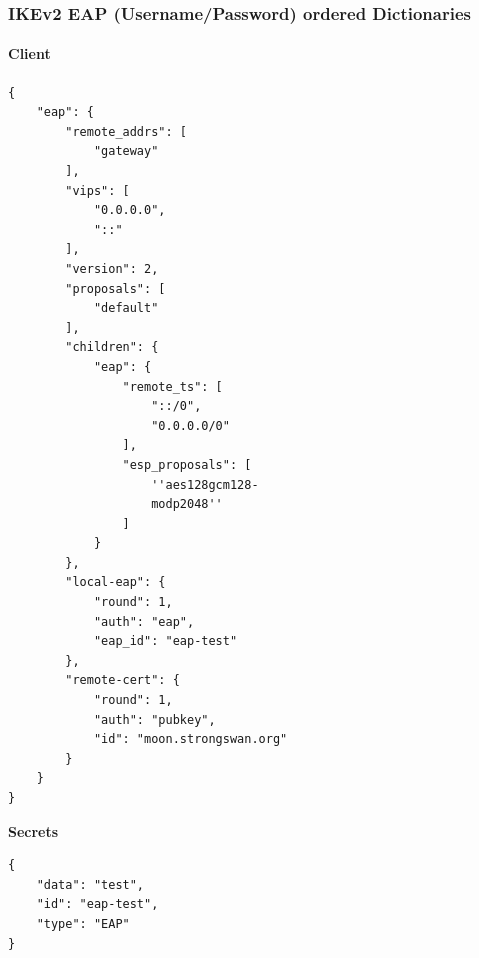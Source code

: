 \subsubsection{IKEv2 EAP (Username/Password) ordered Dictionaries}
\noindent\begin{minipage}[t]{0.5\textwidth}
\vspace{0pt}
\paragraph{Client}\mbox{}\medskip
\begin{lstlisting}[style=BashInputStyle]
{
    "eap": {
        "remote_addrs": [
            "gateway"
        ],
        "vips": [
            "0.0.0.0",
            "::"
        ],
        "version": 2,
        "proposals": [
            "default"
        ],
        "children": {
            "eap": {
                "remote_ts": [
                    "::/0",
                    "0.0.0.0/0"
                ],
                "esp_proposals": [
                    ''aes128gcm128-
                    modp2048''
                ]
            }
        },
        "local-eap": {
            "round": 1,
            "auth": "eap",
            "eap_id": "eap-test"
        },
        "remote-cert": {
            "round": 1,
            "auth": "pubkey",
            "id": "moon.strongswan.org"
        }
    }
}
\end{lstlisting}
\hspace*{18pt}\textbf{Secrets}\mbox{}\medskip
\begin{lstlisting}[style=BashInputStyle]
{
    "data": "test",
    "id": "eap-test",
    "type": "EAP"
}
\end{lstlisting}
\end{minipage}
\hfill
